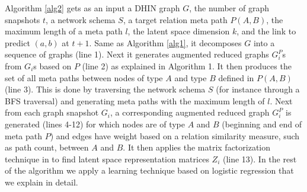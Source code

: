 Algorithm \ref{alg2} gets as an input a DHIN graph $G$, the number of graph snapshots $t$, a network schema $S$, a target relation meta path $P(A,B)$, the maximum length of a meta path $l$, the latent space dimension $k$, and the link to predict $(a,b)$ at $t+1$. Same as Algorithm \ref{alg1}, it decomposes $G$ into a sequence of graphs (line 1). Next it generates augmented reduced graphs $G^P_i$s from $G_i$s based on $P$ (line 2) as explained in Algorithm 1. It then produces the set of all meta paths between nodes of type $A$ and type $B$ defined in $P(A,B)$ (line 3). This is done by traversing the network schema $S$ (for instance through a BFS traversal) and generating meta paths with the maximum length of $l$. Next from each graph snapshot $G_i$, a corresponding augmented reduced graph $G^P_i$ is generated (lines 4-12) for which nodes are of type $A$ and $B$ (beginning and end of meta path $P$) and edges have weight based on a relation similarity measure, such as path count, between $A$ and $B$. It then applies the matrix factorization technique in \cite{Zhu2016} to find latent space representation matrices $Z_i$ (line 13). In the rest of the algorithm we apply a learning technique based on logistic regression that we explain in detail.




